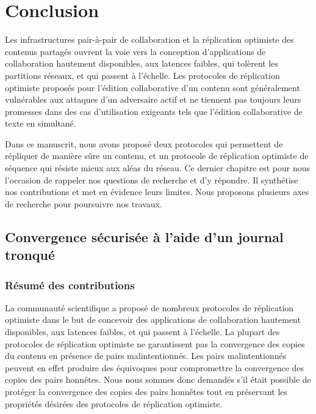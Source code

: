 
\chapter{Conclusion}\label{ch:conclusion}

\minitoc{}
\bigskip


Les infrastructures pair-à-pair de collaboration et la réplication optimiste des contenus partagés ouvrent la voie vers la conception d'applications de collaboration hautement disponibles, aux latences faibles, qui tolèrent les partitions réseaux, et qui passent à l'échelle.
Les protocoles de réplication optimiste proposés pour l'édition collaborative d'un contenu sont généralement vulnérables aux attaques d'un adversaire actif et ne tiennent pas toujours leurs promesses dans des cas d'utilisation exigeants tels que l'édition collaborative de texte en simultané.

Dans ce manuscrit, nous avons proposé deux protocoles qui permettent de répliquer de manière sûre un contenu, et un protocole de réplication optimiste de séquence qui résiste mieux aux aléas du réseau.
Ce dernier chapitre est pour nous l'occasion de rappeler nos questions de recherche et d'y répondre.
Il synthétise nos contributions et met en évidence leurs limites.
Nous proposons plusieurs axes de recherche pour poursuivre nos travaux.


\clearpage


\section{Convergence sécurisée à l'aide d'un journal tronqué}

\subsection{Résumé des contributions}

La communauté scientifique a proposé de nombreux protocoles de réplication optimiste dans le but de concevoir des applications de collaboration hautement disponibles, aux latences faibles, et qui passent à l'échelle.
La plupart des protocoles de réplication optimiste ne garantissent pas la convergence des copies du contenu en présence de pairs malintentionnés.
Les pairs malintentionnés peuvent en effet produire des équivoques pour compromettre la convergence des copies des pairs honnêtes.
Nous nous sommes donc demandés s'il était possible de protéger la convergence des copies des pairs honnêtes tout en préservant les propriétés désirées des protocoles de réplication optimiste.


